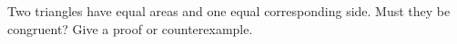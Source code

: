 Two triangles have equal areas and one equal corresponding side. Must they be congruent? Give a proof or counterexample.
